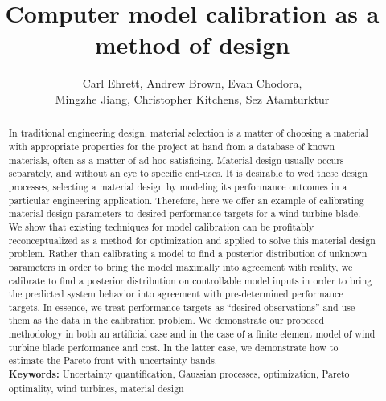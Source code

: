 \documentclass{article}
\author{Carl Ehrett, Andrew Brown, Evan Chodora, \\Mingzhe Jiang, Christopher Kitchens, Sez Atamturktur}
\title{Computer model calibration as a method of design}
\begin{document}
\maketitle

\begin{abstract}

In traditional engineering design, material selection is a matter of choosing a material with appropriate properties for the project at hand from a database of known materials, often as a matter of ad-hoc satisficing. 
%
Material design usually occurs separately, and without an eye to specific end-uses. 
%
It is desirable to wed these design processes, selecting a material design by modeling its performance outcomes in a particular engineering application. 
%
Therefore, here we offer an example of calibrating material design parameters to desired performance targets for a wind turbine blade. 
%
%
We show that existing techniques for model calibration can be profitably reconceptualized as a method for optimization and applied to solve this material design problem.
%
Rather than calibrating a model to find a posterior distribution of unknown parameters in order to bring the model maximally into agreement with reality, we calibrate to find a posterior distribution on controllable model inputs in order to bring the predicted system behavior into agreement with pre-determined performance targets. 
%
In essence, we treat performance targets as ``desired observations'' and use them as the data in the calibration problem. 
%
We demonstrate our proposed methodology in both an artificial case and in the case of a finite element model of wind turbine blade performance and cost. 
%
In the latter case, we demonstrate how to estimate the Pareto front with uncertainty bands.\\

{{\bf Keywords:} Uncertainty quantification, Gaussian processes, optimization, Pareto optimality, wind turbines, material design}
\end{abstract}
\end{document}
